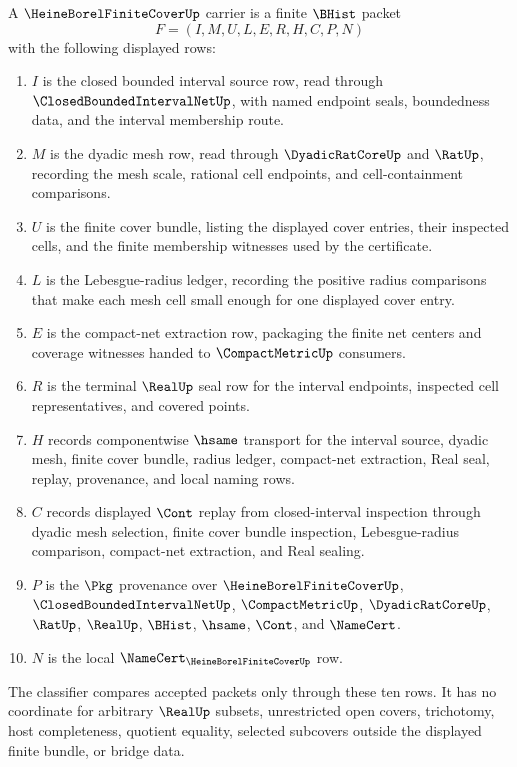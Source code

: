 \begin{definition}
\label{def:heine-borel-finite-cover-carrier}
A $\HeineBorelFiniteCoverUp$ carrier is a finite $\BHist$ packet
$$
F=(I,M,U,L,E,R,H,C,P,N)
$$
with the following displayed rows:
\begin{enumerate}
\item $I$ is the closed bounded interval source row, read through $\ClosedBoundedIntervalNetUp$, with named endpoint seals, boundedness data, and the interval membership route.
\item $M$ is the dyadic mesh row, read through $\DyadicRatCoreUp$ and $\RatUp$, recording the mesh scale, rational cell endpoints, and cell-containment comparisons.
\item $U$ is the finite cover bundle, listing the displayed cover entries, their inspected cells, and the finite membership witnesses used by the certificate.
\item $L$ is the Lebesgue-radius ledger, recording the positive radius comparisons that make each mesh cell small enough for one displayed cover entry.
\item $E$ is the compact-net extraction row, packaging the finite net centers and coverage witnesses handed to $\CompactMetricUp$ consumers.
\item $R$ is the terminal $\RealUp$ seal row for the interval endpoints, inspected cell representatives, and covered points.
\item $H$ records componentwise $\hsame$ transport for the interval source, dyadic mesh, finite cover bundle, radius ledger, compact-net extraction, Real seal, replay, provenance, and local naming rows.
\item $C$ records displayed $\Cont$ replay from closed-interval inspection through dyadic mesh selection, finite cover bundle inspection, Lebesgue-radius comparison, compact-net extraction, and Real sealing.
\item $P$ is the $\Pkg$ provenance over $\HeineBorelFiniteCoverUp$, $\ClosedBoundedIntervalNetUp$, $\CompactMetricUp$, $\DyadicRatCoreUp$, $\RatUp$, $\RealUp$, $\BHist$, $\hsame$, $\Cont$, and $\NameCert$.
\item $N$ is the local $\NameCert_{\HeineBorelFiniteCoverUp}$ row.
\end{enumerate}
The classifier compares accepted packets only through these ten rows. It has no coordinate for arbitrary $\RealUp$ subsets, unrestricted open covers, trichotomy, host completeness, quotient equality, selected subcovers outside the displayed finite bundle, or bridge data.
\end{definition}

